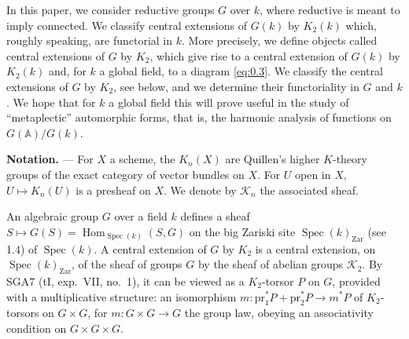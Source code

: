 \documentclass[11pt,a4paper]{article}
\theoremstyle{plain}
\theoremstyle{definition}
\DeclareMathOperator{\Hom}{Hom}
\DeclareMathOperator{\Spec}{Spec}
\newcommand{\cK}{\mathcal{K}}
\newcommand{\bA}{\mathbb{A}}
\newcommand{\pr}{\mathrm{pr}}
\newcommand{\Zar}{\mathrm{Zar}}
\begin{document}
In this paper, we consider reductive groups $G$ over $k$, where reductive is meant to imply connected. We classify central extensions of $G(k)$ by $K_2(k)$ which, roughly speaking, are functorial in $k$. More precisely, we define objects called central extensions of $G$ by $K_2$, which give rise to a central extension of $G(k)$ by $K_2(k)$ and, for $k$ a global field, to a diagram \eqref{eq:0.3}. We classify the central extensions of $G$ by $K_2$, see below, and we determine their functoriality in $G$ and $k$. We hope that for $k$ a global field this will prove useful in the study of ``metaplectic'' automorphic forms, that is, the harmonic analysis of functions on $G(\bA)/G(k)$.

\textbf{Notation.} --- For $X$ a scheme, the $K_n(X)$ are Quillen's higher $K$-theory groups of the exact category of vector bundles on $X$. For $U$ open in $X$, $U \mapsto K_n(U)$ is a presheaf on $X$. We denote by $\cK_n$ the associated sheaf.

An algebraic group $G$ over a field $k$ defines a sheaf $S \mapsto G(S) = \Hom_{\Spec(k)}(S,G)$ on the big Zariski site $\Spec(k)_{\Zar}$ (see 1.4) of $\Spec(k)$. A central extension of $G$ by $K_2$ is a central extension, on $\Spec(k)_{\Zar}$, of the sheaf of groups $G$ by the sheaf of abelian groups $\cK_2$. By SGA7 (tI, exp.~VII, no.~1), it can be viewed as a $K_2$-torsor $P$ on $G$, provided with a multiplicative structure: an isomorphism $m: \pr_1^*P + \pr_2^*P \to m^*P$ of $K_2$-torsors on $G \times G$, for $m: G \times G \to G$ the group law, obeying an associativity condition on $G \times G \times G$.
\end{document}

